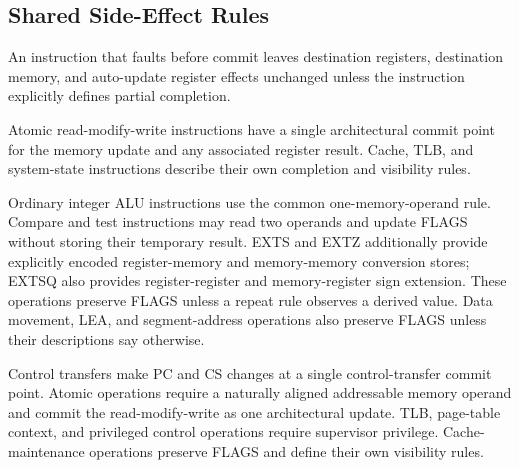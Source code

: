 \subsection{Shared Side-Effect Rules}
An instruction that faults before commit leaves destination registers, destination memory, and auto-update
register effects unchanged unless the instruction explicitly defines partial completion.

Atomic read-modify-write instructions have a single architectural commit point for the memory update and any associated
register result. Cache, TLB, and system-state instructions describe their own completion and visibility rules.

Ordinary integer ALU instructions use the common one-memory-operand rule. Compare and test instructions may read two operands and
update FLAGS without storing their temporary result. EXTS and EXTZ additionally provide explicitly encoded
register-memory and memory-memory conversion stores; EXTSQ also provides register-register and memory-register sign
extension. These operations preserve FLAGS unless a repeat rule observes a derived value. Data movement, LEA, and
segment-address operations also preserve FLAGS unless their descriptions say otherwise.

Control transfers make PC and CS changes at a single control-transfer commit point. Atomic operations require a
naturally aligned addressable memory operand and commit the read-modify-write as one architectural update. TLB,
page-table context, and privileged control operations require supervisor privilege. Cache-maintenance operations
preserve FLAGS and define their own visibility rules.
